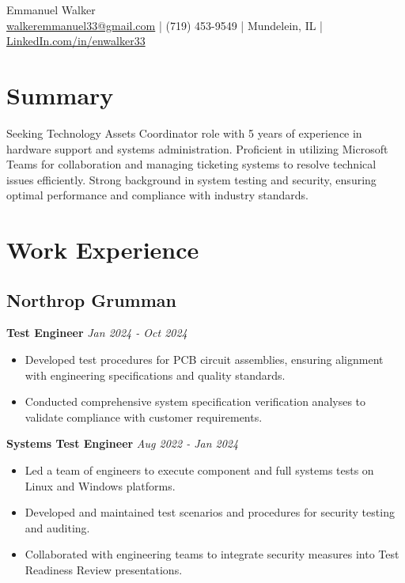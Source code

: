 \documentclass[a4paper,10pt]{article}
\begin{document}
\begin{center}
    {\LARGE Emmanuel Walker} \\[5pt]
    \href{mailto:walkeremmanuel33@gmail.com}{walkeremmanuel33@gmail.com} | (719) 453-9549 | Mundelein, IL | \href{https://linkedin.com/in/enwalker33}{LinkedIn.com/in/enwalker33}
\end{center}

\section{Summary}
Seeking Technology Assets Coordinator role with 5 years of experience in hardware support and systems administration. Proficient in utilizing Microsoft Teams for collaboration and managing ticketing systems to resolve technical issues efficiently. Strong background in system testing and security, ensuring optimal performance and compliance with industry standards.

\section{Work Experience}

\subsection{Northrop Grumman}
\textbf{Test Engineer} \hfill \textit{Jan 2024 - Oct 2024}  
\begin{itemize}[leftmargin=*]
    \item Developed test procedures for PCB circuit assemblies, ensuring alignment with engineering specifications and quality standards.
    \item Conducted comprehensive system specification verification analyses to validate compliance with customer requirements.
\end{itemize}

\textbf{Systems Test Engineer} \hfill \textit{Aug 2022 - Jan 2024}  
\begin{itemize}[leftmargin=*]
    \item Led a team of engineers to execute component and full systems tests on Linux and Windows platforms.
    \item Developed and maintained test scenarios and procedures for security testing and auditing.
    \item Collaborated with engineering teams to integrate security measures into Test Readiness Review presentations.
\end{itemize}
\end{document}
